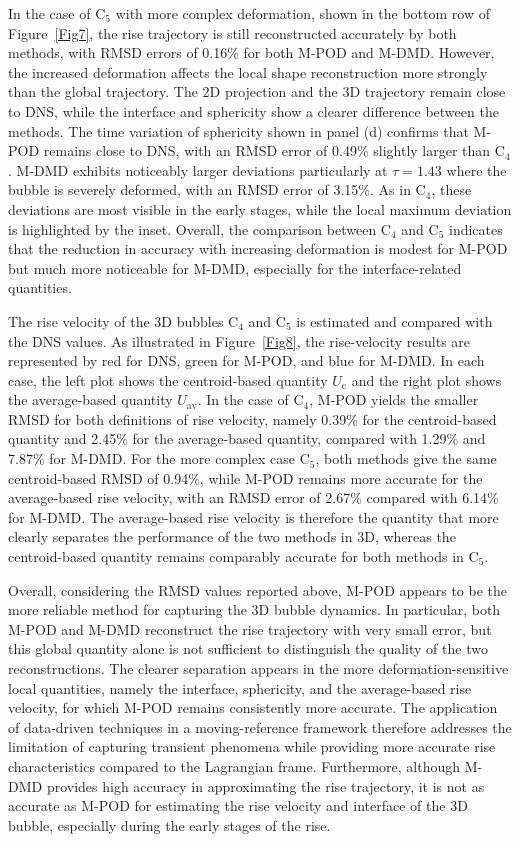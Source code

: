 \documentclass[a4paper,fleqn]{cas-sc}
\begin{document}
	In the case of C$_5$ with more complex deformation, shown in the bottom row of Figure~\ref{Fig7}, the rise trajectory is still reconstructed accurately by both methods, with RMSD errors of 0.16\% for both M-POD and M-DMD. However, the increased deformation affects the local shape reconstruction more strongly than the global trajectory. The 2D projection and the 3D trajectory remain close to DNS, while the interface and sphericity show a clearer difference between the methods. The time variation of sphericity shown in panel (d) confirms that M-POD remains close to DNS, with an RMSD error of 0.49\% slightly larger than C$_4$. M-DMD exhibits noticeably larger deviations particularly at $\tau=1.43$ where the bubble is severely deformed, with an RMSD error of 3.15\%. As in C$_4$, these deviations are most visible in the early stages, while the local maximum deviation is highlighted by the inset. Overall, the comparison between C$_4$ and C$_5$ indicates that the reduction in accuracy with increasing deformation is modest for M-POD but much more noticeable for M-DMD, especially for the interface-related quantities.
	
	The rise velocity of the 3D bubbles C$_4$ and C$_5$ is estimated and compared with the DNS values. As illustrated in Figure~\ref{Fig8}, the rise-velocity results are represented by red for DNS, green for M-POD, and blue for M-DMD. In each case, the left plot shows the centroid-based quantity $U_{\mathrm{c}}$ and the right plot shows the average-based quantity $U_{\mathrm{av}}$. In the case of C$_4$, M-POD yields the smaller RMSD for both definitions of rise velocity, namely 0.39\% for the centroid-based quantity and 2.45\% for the average-based quantity, compared with 1.29\% and 7.87\% for M-DMD. For the more complex case C$_5$, both methods give the same centroid-based RMSD of 0.94\%, while M-POD remains more accurate for the average-based rise velocity, with an RMSD error of 2.67\% compared with 6.14\% for M-DMD. The average-based rise velocity is therefore the quantity that more clearly separates the performance of the two methods in 3D, whereas the centroid-based quantity remains comparably accurate for both methods in C$_5$.
	
	Overall, considering the RMSD values reported above, M-POD appears to be the more reliable method for capturing the 3D bubble dynamics. In particular, both M-POD and M-DMD reconstruct the rise trajectory with very small error, but this global quantity alone is not sufficient to distinguish the quality of the two reconstructions. The clearer separation appears in the more deformation-sensitive local quantities, namely the interface, sphericity, and the average-based rise velocity, for which M-POD remains consistently more accurate. The application of data-driven techniques in a moving-reference framework therefore addresses the limitation of capturing transient phenomena while providing more accurate rise characteristics compared to the Lagrangian frame. Furthermore, although M-DMD provides high accuracy in approximating the rise trajectory, it is not as accurate as M-POD for estimating the rise velocity and interface of the 3D bubble, especially during the early stages of the rise.
		
\end{document}
